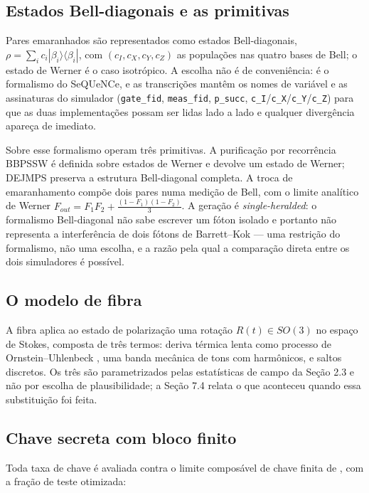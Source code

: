 \documentclass[12pt]{article}
\begin{document}
\subsection{Estados Bell-diagonais e as primitivas}

Pares emaranhados são representados como estados Bell-diagonais,
$\rho = \sum_i c_i |\beta_i\rangle\langle\beta_i|$, com
$(c_I, c_X, c_Y, c_Z)$ as populações nas quatro bases de Bell; o estado de
Werner \cite{werner1989} é o caso isotrópico. A escolha não é de conveniência:
é o formalismo do SeQUeNCe, e as transcrições mantêm os nomes de variável e as
assinaturas do simulador (\texttt{gate\_fid}, \texttt{meas\_fid},
\texttt{p\_succ}, \texttt{c\_I}/\texttt{c\_X}/\texttt{c\_Y}/\texttt{c\_Z}) para
que as duas implementações possam ser lidas lado a lado e qualquer divergência
apareça de imediato.

Sobre esse formalismo operam três primitivas. A purificação por recorrência
BBPSSW \cite{bennett1996} é definida sobre estados de Werner e devolve um
estado de Werner; DEJMPS \cite{deutsch1996} preserva a estrutura Bell-diagonal
completa. A troca de emaranhamento compõe dois pares numa medição de Bell, com
o limite analítico de Werner
$F_{out} = F_1F_2 + \frac{(1-F_1)(1-F_2)}{3}$. A geração é
\emph{single-heralded}: o formalismo Bell-diagonal não sabe escrever um fóton
isolado e portanto não representa a interferência de dois fótons de
Barrett--Kok \cite{barrett2005} --- uma restrição do formalismo, não uma
escolha, e a razão pela qual a comparação direta entre os dois simuladores é
possível.

\subsection{O modelo de fibra}

A fibra aplica ao estado de polarização uma rotação $R(t) \in SO(3)$ no espaço
de Stokes, composta de três termos: deriva térmica lenta como processo de
Ornstein--Uhlenbeck \cite{uhlenbeck1930}, uma banda mecânica de tons com
harmônicos, e saltos discretos. Os três são parametrizados pelas estatísticas
de campo da Seção 2.3 e não por escolha de plausibilidade; a Seção 7.4 relata o
que aconteceu quando essa substituição foi feita.

\subsection{Chave secreta com bloco finito}

Toda taxa de chave é avaliada contra o limite composável de chave finita de
\cite{tomamichel2012}, com a fração de teste otimizada:
\end{document}
